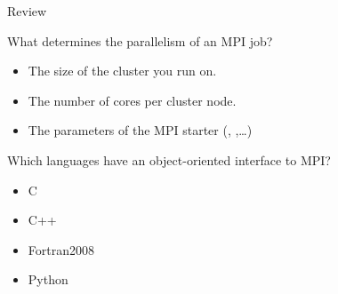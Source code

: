  {Review}

\begin{review}
  What determines the parallelism of an MPI job?
  \begin{itemize}
  \item The size of the cluster you run on.
  \item The number of cores per cluster node.
  \item The parameters of the MPI starter (,
    ,\ldots)
  \end{itemize}
\end{review}

\begin{review}
  Which languages have an object-oriented interface to MPI?
  \begin{itemize}
  \item C
  \item C++
  \item Fortran2008
  \item Python
  \end{itemize}
\end{review}
